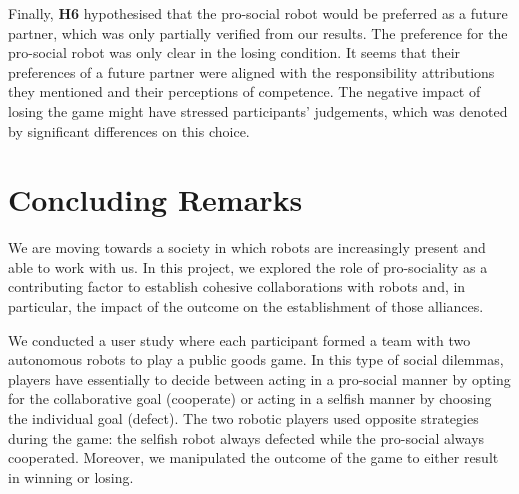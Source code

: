 Finally, \textbf{H6} hypothesised that the pro-social robot would be preferred as a future partner, which was only partially verified from our results. The preference for the pro-social robot was only clear in the losing condition. It seems that their preferences of a future partner were aligned with the responsibility attributions they mentioned and their perceptions of competence. The negative impact of losing the game might have stressed participants' judgements, which was denoted by significant differences on this choice.%

\section{Concluding Remarks}
\label{sec:concluding-remarks}

We are moving towards a society in which robots are increasingly present and able to work with us. In this project, we explored the role of pro-sociality as a contributing factor to establish cohesive collaborations with robots and, in particular, the impact of the outcome on the establishment of those alliances.

We conducted a user study where each participant formed a team with two autonomous robots to play a public goods game. In this type of social dilemmas, players have essentially to decide between acting in a pro-social manner by opting for the collaborative goal (cooperate) or acting in a selfish manner by choosing the individual goal (defect). The two robotic players used opposite strategies during the game: the selfish robot always defected while the pro-social always cooperated. Moreover, we manipulated the outcome of the game to either result in winning or losing.

